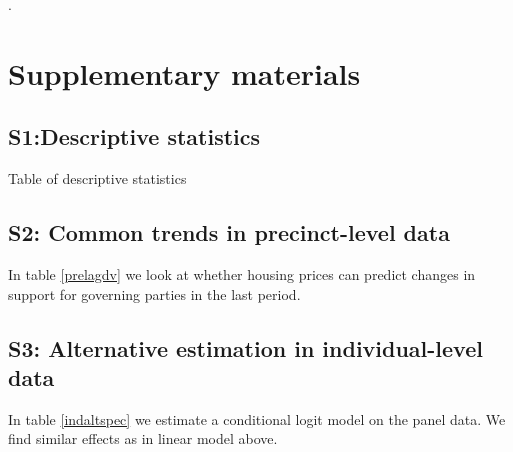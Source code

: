 \documentclass[12pt,a4paper]{article}
\begin{document}




.





\clearpage

\singlespacing




\newpage

\section*{Supplementary materials}

\subsection*{S1:Descriptive statistics}

Table of descriptive statistics

\newpage

\subsection*{S2: Common trends in precinct-level data}
In table \ref{prelagdv} we look at whether housing prices can predict changes in support for governing parties in the last period. 




\newpage

\subsection*{S3: Alternative estimation in individual-level data}
In table \ref{indaltspec} we estimate a conditional logit model on the panel data. We find similar effects as in linear model above.
\end{document}

